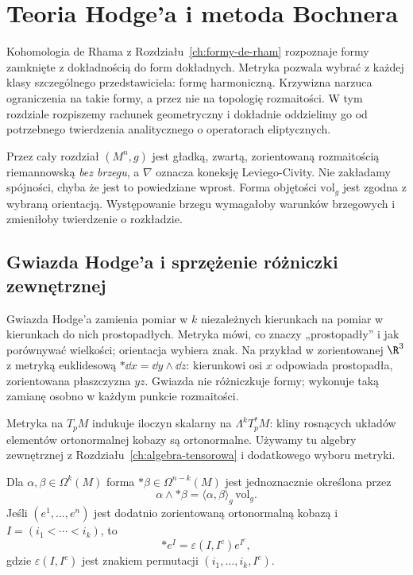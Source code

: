 \chapter{Teoria Hodge'a i metoda Bochnera}
\label{ch:hodge-bochner}

Kohomologia de Rhama z Rozdziału~\ref{ch:formy-de-rham}
rozpoznaje formy zamknięte z dokładnością do form dokładnych.
Metryka pozwala wybrać z każdej klasy szczególnego przedstawiciela:
formę harmoniczną. Krzywizna narzuca ograniczenia na takie formy,
a przez nie na topologię rozmaitości. W tym rozdziale rozpiszemy
rachunek geometryczny i dokładnie oddzielimy go od potrzebnego
twierdzenia analitycznego o operatorach eliptycznych.

Przez cały rozdział $(M^n,g)$ jest gładką, zwartą,
zorientowaną rozmaitością riemannowską \emph{bez brzegu},
a $\nabla$ oznacza koneksję Leviego-Civity.
Nie zakładamy spójności, chyba że jest to powiedziane wprost.
Forma objętości $\mathrm{vol}_g$ jest zgodna z wybraną orientacją.
Występowanie brzegu wymagałoby warunków brzegowych i zmieniłoby
twierdzenie o rozkładzie.

\section{Gwiazda Hodge'a i sprzężenie różniczki zewnętrznej}
\label{sec:hodge-gwiazda}

Gwiazda Hodge'a zamienia pomiar w $k$ niezależnych kierunkach
na pomiar w kierunkach do nich prostopadłych. Metryka mówi,
co znaczy „prostopadły” i jak porównywać wielkości;
orientacja wybiera znak. Na przykład w zorientowanej
$\R^3$ z metryką euklidesową $*\dd x=\dd y\wedge\dd z$:
kierunkowi osi $x$ odpowiada prostopadła, zorientowana
płaszczyzna $yz$. Gwiazda nie różniczkuje formy; wykonuje
taką zamianę osobno w każdym punkcie rozmaitości.

Metryka na $T_pM$ indukuje iloczyn skalarny na
$\Lambda^kT_p^*M$: kliny rosnących układów elementów
ortonormalnej kobazy są ortonormalne. Używamy tu algebry
zewnętrznej z Rozdziału~\ref{ch:algebra-tensorowa} i
dodatkowego wyboru metryki.

\begin{definicja}
\label{def:hodge-star}
Dla $\alpha,\beta\in\Omega^k(M)$ forma
$*\beta\in\Omega^{n-k}(M)$ jest jednoznacznie określona przez
\begin{equation}\label{eq:hodge-star-def}
 \alpha\wedge *\beta=\langle\alpha,\beta\rangle_g
                         \,\mathrm{vol}_g.
\end{equation}
Jeśli $(e^1,\ldots,e^n)$ jest dodatnio zorientowaną
ortonormalną kobazą i $I=(i_1<\cdots<i_k)$, to
\[
 *e^I=\varepsilon(I,I^c)e^{I^c},
\]
gdzie $\varepsilon(I,I^c)$ jest znakiem permutacji
$(i_1,\ldots,i_k,I^c)$.
\end{definicja}

